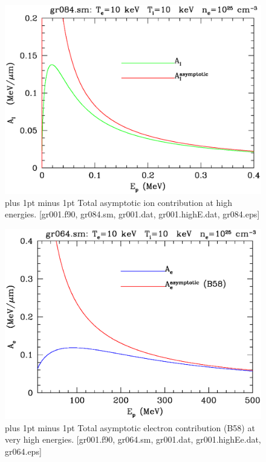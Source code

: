 \documentclass[preprint,12pt,eqsecnum,nofootinbib,amsmath,amssymb]{revtex4}
\newcommand{\footnoteskip}{\baselineskip 12pt plus 1pt minus 1pt}
\begin{document}
\vskip-2cm 
\begin{figure}[h!]
\includegraphics[scale=0.45]{gr084.eps} 
\vskip-0.8cm 
\caption{\footnoteskip  
  Total asymptotic ion contribution at high energies. [gr001.f90,
  gr084.sm, gr001.dat, gr001.highE.dat, gr084.eps]
}
\label{fig:gr084}
\end{figure}


\vskip-2cm 
\begin{figure}[h!]
\includegraphics[scale=0.45]{gr064.eps}
\vskip-0.8cm 
\caption{\footnoteskip  
  Total asymptotic electron contribution (B58) at very high
  energies. [gr001.f90, gr064.sm, gr001.dat, gr001.highEe.dat, gr064.eps]
}
\label{fig:gr064}
\end{figure}
\end{document}
